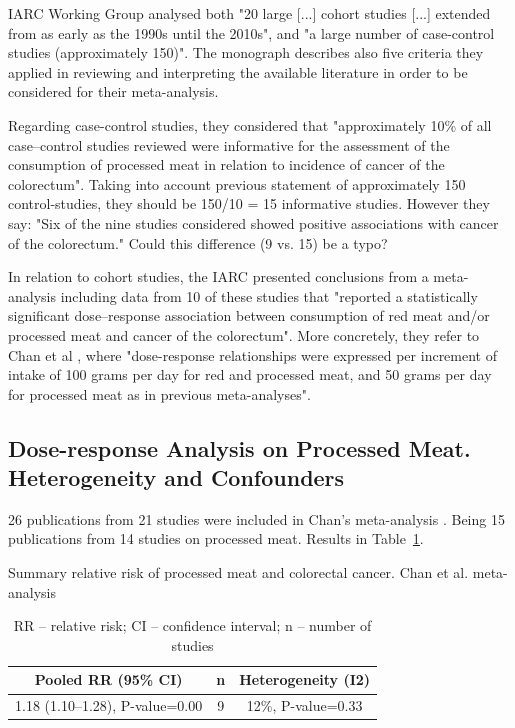 \documentclass{article}
\begin{document}
IARC Working Group analysed both "20 large [...] cohort studies [...] extended from as early as the 1990s until the 2010s", and "a large number of case-control studies (approximately 150)".\cite{monograph} The monograph describes also five criteria they applied in reviewing and interpreting the available literature in order to be considered for their meta-analysis. %

Regarding case-control studies, they considered that "approximately 10\% of all case–control studies reviewed were informative for the assessment of the consumption of processed meat in relation to incidence of cancer of the colorectum". Taking into account previous statement of approximately 150 control-studies, they should be 150/10 = 15 informative studies. However they say: "Six of the nine studies considered showed positive associations with cancer of the colorectum." Could this difference (9 vs. 15) be a typo?

In relation to cohort studies, the IARC presented conclusions from a meta-analysis including data from 10
of these studies that "reported a statistically significant dose–response association between consumption
of red meat and/or processed meat and cancer of the colorectum". More concretely, they refer to Chan et al \cite{chan}, where "dose-response relationships were expressed per increment of intake of 100 grams
per day for red and processed meat, and 50 grams per day for processed meat as in previous meta-analyses".\cite{sandhu}%


\subsection{Dose-response Analysis on Processed Meat. Heterogeneity and Confounders}

26 publications from 21 studies were included in Chan's meta-analysis \cite{chan}. Being 15 publications from 14 studies on processed meat. Results in Table~\ref{tab:table}.

\begin{table}
 \caption{Summary relative risk of processed meat and colorectal cancer. Chan et al. meta-analysis}
  \centering

  \begin{center}
   \begin{tabular}{||c c c||}
   \hline
   Pooled RR (95\% CI)     & n     & Heterogeneity (I2)\\ [0.5ex]
   \hline\hline
     1.18 (1.10–1.28), P-value=0.00  & 9 & 12\%, P-value=0.33     \\ [1ex]
   \hline
  \end{tabular}

  \caption*{RR – relative risk; CI – confidence interval; n – number of studies}
  \end{center}

  \label{tab:table}
\end{table}
\end{document}

